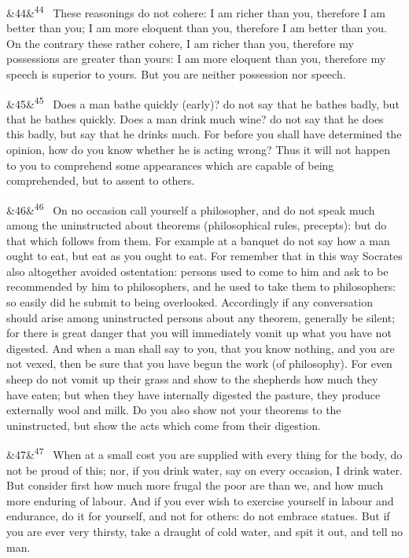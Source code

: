 \documentclass[12pt]{article}
\newcommand{\para}[1][]{\par\noindent\ifx&#1&\else\textsuperscript{\footnotesize #1}~\fi}
\begin{document}
\para[44] These reasonings do not cohere: I am richer than you, therefore I am better than you; I am more eloquent than you, therefore I am better than you. On the contrary these rather cohere, I am richer than you, therefore my possessions are greater than yours: I am more eloquent than you, therefore my speech is superior to yours. But you are neither possession nor speech.

\para[45] Does a man bathe quickly (early)? do not say that he bathes badly, but that he bathes quickly. Does a man drink much wine? do not say that he does this badly, but say that he drinks much. For before you shall have determined the opinion, how do you know whether he is acting wrong? Thus it will not happen to you to comprehend some appearances which are capable of being comprehended, but to assent to others.

\para[46] On no occasion call yourself a philosopher, and do not speak much among the uninstructed about theorems (philosophical rules, precepts): but do that which follows from them. For example at a banquet do not say how a man ought to eat, but eat as you ought to eat. For remember that in this way Socrates also altogether avoided ostentation: persons used to come to him and ask to be recommended by him to philosophers, and he used to take them to philosophers: so easily did he submit to being overlooked. Accordingly if any conversation should arise among uninstructed persons about any theorem, generally be silent; for there is great danger that you will immediately vomit up what you have not digested. And when a man shall say to you, that you know nothing, and you are not vexed, then be sure that you have begun the work (of philosophy). For even sheep do not vomit up their grass and show to the shepherds how much they have eaten; but when they have internally digested the pasture, they produce externally wool and milk. Do you also show not your theorems to the uninstructed, but show the acts which come from their digestion.

\para[47] When at a small cost you are supplied with every thing for the body, do not be proud of this; nor, if you drink water, say on every occasion, I drink water. But consider first how much more frugal the poor are than we, and how much more enduring of labour. And if you ever wish to exercise yourself in labour and endurance, do it for yourself, and not for others: do not embrace statues. But if you are ever very thirsty, take a draught of cold water, and spit it out, and tell no man.
\end{document}
